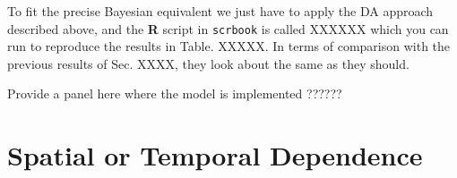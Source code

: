 To fit the precise Bayesian equivalent we just have to apply the DA
approach described above, and the {\bf R} script in \mbox{\tt scrbook}
is called XXXXXX which you can run to reproduce the results in Table. XXXXX.
In terms of comparison with the previous results of Sec. XXXX, they
look about the same as they should. 

Provide a panel here where the model is implemented ??????

\section{Spatial or Temporal Dependence}

